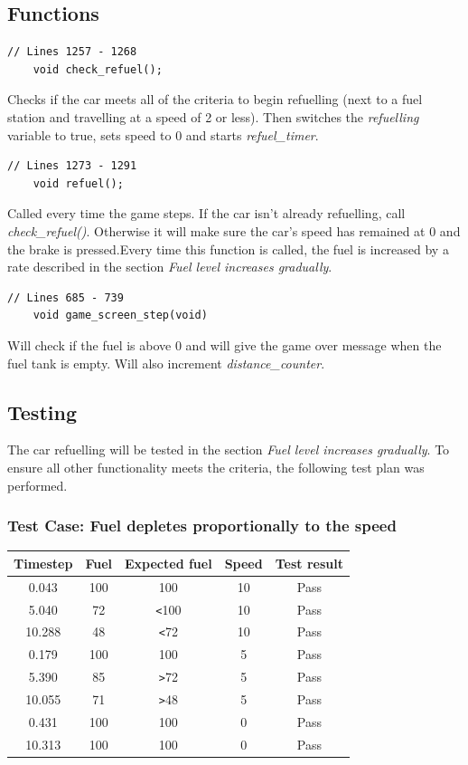 \documentclass{article}
\begin{document}
\subsection*{Functions}
\begin{lstlisting}[style=CStyle]
	// Lines 1257 - 1268
	void check_refuel();
\end{lstlisting}
Checks if the car meets all of the criteria to begin refuelling (next to a fuel station and travelling at a speed of 2 or less). Then switches the \emph{refuelling} variable to true, sets speed to 0 and starts \emph{refuel\_timer}.
\begin{lstlisting}[style=CStyle]
	// Lines 1273 - 1291
	void refuel();
\end{lstlisting}
Called every time the game steps. If the car isn't already refuelling, call \emph{check\_refuel()}. Otherwise it will make sure the car's speed has remained at 0 and the brake is pressed.Every time this function is called, the fuel is increased by a rate described in the section \emph{Fuel level increases gradually}.
\begin{lstlisting}[style=CStyle]
	// Lines 685 - 739
	void game_screen_step(void)
\end{lstlisting}
Will check if the fuel is above 0 and will give the game over message when the fuel tank is empty. Will also increment \emph{distance\_counter}.
\newpage

\subsection*{Testing}
The car refuelling will be tested in the section \emph{Fuel level increases gradually}. To ensure all other functionality meets the criteria, the following test plan was performed.

\subsubsection*{Test Case: Fuel depletes proportionally to the speed}
\begin{center}
\begin{tabular}{ c c c c c }
Timestep	& Fuel		& Expected fuel	& Speed	& Test result		\\ \hline
0.043		& 100		& 100			& 10		& Pass		\\
5.040		& 72		& \verb|<|100	& 10		& Pass		\\
10.288	& 48		& \verb|<|72	& 10		& Pass		\\
0.179		& 100		& 100			& 5		& Pass		\\
5.390		& 85		& \verb|>|72	& 5		& Pass		\\
10.055	& 71		& \verb|>|48	& 5		& Pass		\\
0.431		& 100		& 100			& 0		& Pass		\\
10.313	& 100		& 100			& 0		& Pass		\\ \hline
\end{tabular}
\end{center}
\end{document}
